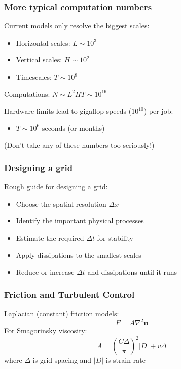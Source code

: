 \documentclass[red]{beamer}
\begin{document}
\begin{frame}
    \frametitle{More typical computation numbers}
    
    Current models only resolve the biggest scales:
    \begin{itemize}
        \item Horizontal scales: $L \sim 10^3$
        \item Vertical scales: $H \sim 10^2$
        \item Timescales: $T \sim 10^{8}$
    \end{itemize}
    Computations: $N \sim L^2 H T \sim 10^{16}$
    
    \vspace{10pt}
    
    Hardware limits lead to gigaflop speeds ($10^{10}$) per job:
    \begin{itemize}
        \item $T \sim 10^{6}$ seconds (or months)
    \end{itemize}
    (Don't take any of these numbers too seriously!)
\end{frame}

\begin{frame}
    \frametitle{Designing a grid}
    
    Rough guide for designing a grid:
    \begin{itemize}
        \item Choose the spatial resolution $\Delta x$
        \item Identify the important physical processes
        \item Estimate the required $\Delta t$ for stability
        \item Apply dissipations to the smallest scales
        \item Reduce or increase $\Delta t$ and dissipations until it runs
    \end{itemize}
\end{frame}

\begin{frame}
    \frametitle{Friction and Turbulent Control}
    
    Laplacian (constant) friction models:
    $$
    F = A \nabla^2 \mathbf{u}
    $$
    For Smagorinsky viscosity:
    $$
    A = \left(\frac{C \Delta}{\pi}\right)^2 |D| + v \Delta
    $$
    where $\Delta$ is grid spacing and $|D|$ is strain rate
\end{frame}
\end{document}
